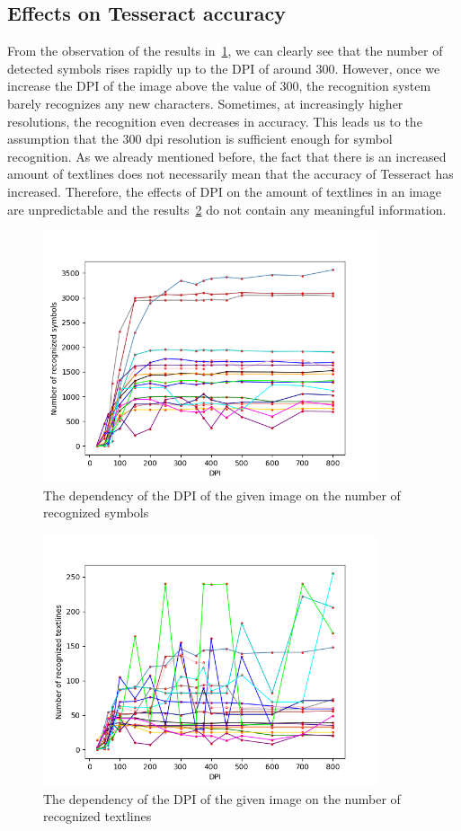 \subsection{Effects on Tesseract accuracy}

From the observation of the results in~\cref{fig:dpiSymbols}, we can clearly see that the number of detected symbols rises rapidly up to the DPI of around 300. However, once we increase the DPI of the image above the value of 300, the recognition system barely recognizes any new characters. Sometimes, at increasingly higher resolutions, the recognition even decreases in accuracy. This leads us to the assumption that the 300 dpi resolution is sufficient enough for symbol recognition. As we already mentioned before, the fact that there is an increased amount of textlines does not necessarily mean that the accuracy of Tesseract has increased. Therefore, the effects of DPI on the amount of textlines in an image are unpredictable and the results~\cref{fig:dpiTextlines} do not contain any meaningful information.

\begin{figure}
\centering
\includegraphics[height=20em]{img/results/dpiSymbols.png}
\caption{The dependency of the DPI of the given image on the number of recognized symbols}
\label{fig:dpiSymbols}
\end{figure}

\begin{figure}
\centering
\includegraphics[height=20em]{img/results/dpiTextlines.png}
\caption{The dependency of the DPI of the given image on the number of recognized textlines}
\label{fig:dpiTextlines}
\end{figure}

